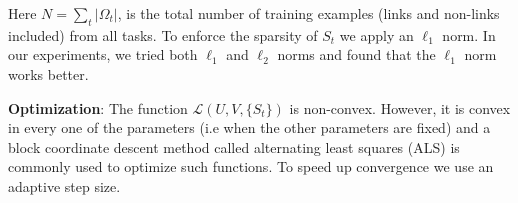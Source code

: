 \documentclass[runningheads,a4paper]{llncs}
\newcommand{\argmin}{\operatornamewithlimits{argmin}}
\begin{document}
Here $N = \sum_t | \Omega_t |$, is the total number of training examples (links and non-links included) from all tasks. To enforce the sparsity of $S_t$ we apply an $\ell_1$ norm. In our experiments, we tried both $\ell_1$ and $\ell_2$ norms and found that the $\ell_1$ norm works better.


%




\noindent \textbf{Optimization}:
The function $\mathcal{L}(U, V, \{S_t\})$ is non-convex. However, it is convex in every one of the parameters (i.e when the other parameters are fixed) 
and a block coordinate descent method called alternating least squares (ALS) is commonly used to optimize such functions. 
To speed up convergence we use an adaptive step size. %
\end{document}
